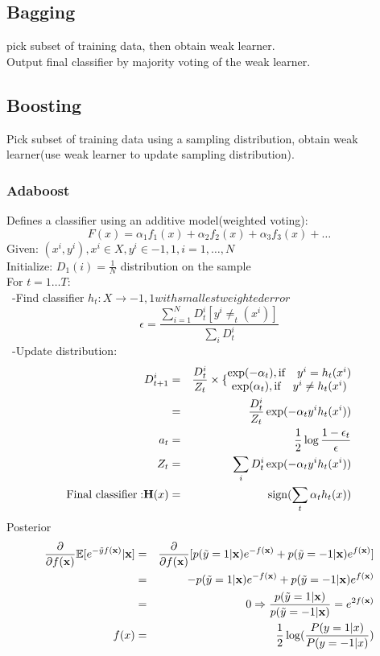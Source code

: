 \documentclass[12pt,a4paper]{article}
\begin{document}
\subsection*{Bagging}
pick subset of training data, then obtain weak learner.\\
Output final classifier by majority voting of the weak learner.\\
\subsection*{Boosting}
Pick subset of training data using a sampling distribution, obtain weak learner(use weak learner to update sampling distribution).\\
\subsubsection*{Adaboost}
Defines a classifier using an additive model(weighted voting):
$$
F(x) = \alpha_1f_1(x)+\alpha_2f_2(x)+\alpha_3f_3(x)+\ldots
$$
Given: $(x^i,y^i),x^i\in X, y^i\in{-1,1},i=1,\ldots,N$\\
Initialize: $D_1(i)=\frac{1}{N}$ distribution on the sample\\
For $t=1\ldots T$:\\
\ -Find classifier $h_t:X\rightarrow {-1,1} with smallest weighted error$\\
$$
\epsilon = \frac{\sum_{i=1}^{N}D_t^i[y^i\neq_t(x^i)]}{\sum_{i}{D_t^i}}
$$
\ -Update distribution: 
\begin{eqnarray*}
D_{t+1}^i &=& \frac{D_t^i}{Z_t}\times \{\begin{matrix}
\exp(-\alpha_t), {\rm if} \quad y^i = h_t(x^i)\\
\exp(\alpha_t), {\rm if} \quad y^i \neq h_t(x^i)
\end{matrix} \\
 &=& \frac{D_t^i}{Z_t}\exp(-\alpha_ty^ih_t(x^i)) \\
a_t &=& \frac{1}{2}\log\frac{1-\epsilon_t}{\epsilon}\\
Z_t &=& \sum_i D^i_t\exp(-\alpha_ty^ih_t(x^i))\\
{\rm Final\  classifier :} {\bf H}(x) &=&{\rm sign}(\sum_{t}\alpha_th_t(x)) 
\end{eqnarray*}
\large{Posterior}
\begin{eqnarray*}
\frac{\partial}{\partial f({\bf x})} \mathbb{E}[e^{-\tilde{y}f({\bf x})}|{\bf x}]&=& \frac{\partial}{\partial f({\bf x})}[p(\tilde{y}=1|{\bf x})e^{-f({\bf x})}+p(\tilde y=-1|{\bf x})e^{f({\bf x})}] \\
&=& -p(\tilde{y}=1|{\bf x})e^{-f({\bf x})}+p(\tilde{y}=-1|{\bf x})e^{f({\bf x})} \\
&=& 0 \Rightarrow \frac{p(\tilde{y}=1|{\bf x})}{p(\tilde{y}=-1|{\bf x})} =e^{2f({\bf x})}\\
f(x) &=& \frac{1}{2}\log(\frac{P(y=1|x)}{P(y=-1|x)})\\
\end{eqnarray*}
\end{document}
